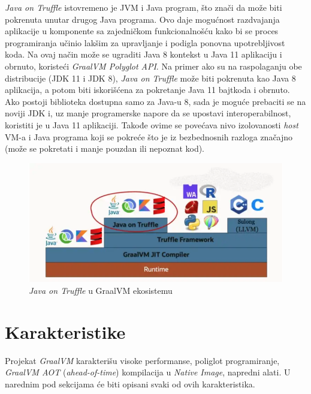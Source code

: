 \documentclass[a4paper]{article}
\begin{document}
\emph{Java on Truffle} istovremeno je JVM i Java program, što znači da može biti pokrenuta unutar drugog Java programa. Ovo daje mogućnost razdvajanja aplikacije u komponente sa zajedničkom funkcionalnošću kako bi se proces programiranja učinio lakšim za upravljanje i podigla ponovna upotrebljivost koda. Na ovaj način može se ugraditi Java 8 kontekst u Java 11 aplikaciju i obrnuto, koristeći \emph{GraalVM Polyglot API}. Na primer ako su na raspolaganju obe distribucije (JDK 11 i JDK 8), \emph{Java on Truffle} može biti pokrenuta kao Java 8 aplikacija, a potom biti iskorišćena za pokretanje Java 11 bajtkoda i obrnuto. Ako postoji biblioteka dostupna samo za Java-u 8, sada je moguće prebaciti se na noviji JDK i, uz manje programerske napore da se upostavi interoperabilnost, koristiti je u Java 11 aplikaciji. Takođe ovime se povećava nivo izolovanosti \emph{host} VM-a i Java programa koji se pokreće što je iz bezbednosnih razloga značajno (može se pokretati i manje pouzdan ili nepoznat kod). \\


\begin{figure}
	\begin{center}
	\includegraphics[scale=0.35]{imgs/java_on_truffle.png}
	\end{center}
	\caption{\emph{Java on Truffle} u GraalVM ekosistemu}
	\label{fig: java on truffle}
\end{figure}



\section{Karakteristike}
\label{sec:Karakteristike}

Projekat \emph{GraalVM} karakterišu visoke performanse, poliglot programiranje, \emph{GraalVM AOT} (\emph{ahead-of-time}) kompilacija u \emph{Native Image}, napredni alati\cite{graalvm}. U narednim pod sekcijama će biti opisani svaki od ovih karakteristika.
\end{document}
